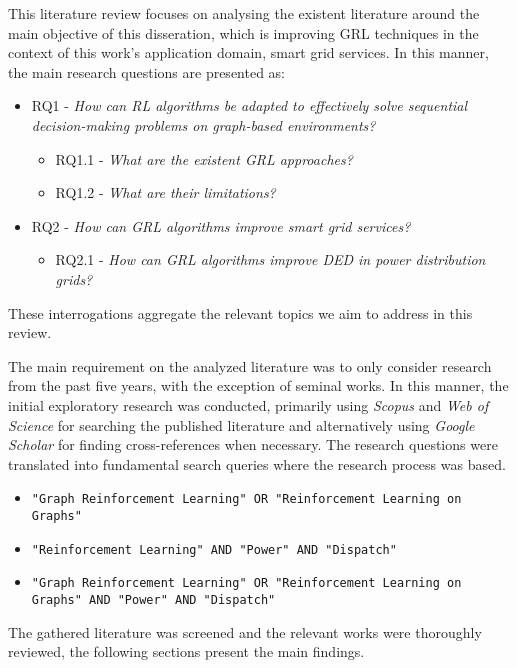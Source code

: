 This literature review focuses on analysing the existent literature around the main objective of this disseration, which is improving \ac{GRL} techniques in the context of this work's application domain, smart grid services. In this manner, the main research questions are presented as:

\begin{itemize}
	\item RQ1 - \textit{How can \ac{RL} algorithms be adapted to effectively solve sequential decision-making problems on graph-based environments?} 
	\begin{itemize}
		\item RQ1.1 - \textit{What are the existent \ac{GRL} approaches?}
		\item RQ1.2 - \textit{What are their limitations? }
	\end{itemize}
	\item RQ2 - \textit{How can \ac{GRL} algorithms improve smart grid services?}
	\begin{itemize}
		\item RQ2.1 - \textit{How can \ac{GRL} algorithms improve \acf{DED} in power distribution grids?}
	\end{itemize}
\end{itemize}

These interrogations aggregate the relevant topics we aim to address in this review. 

The main requirement on the analyzed literature was to only consider research from the past five years, with the exception of seminal works. In this manner, the initial exploratory research was conducted, primarily using \textit{Scopus} and \textit{Web of Science} for searching the published literature and alternatively using \textit{Google Scholar} for finding cross-references when necessary. 
The research questions were translated into fundamental search queries where the research process was based.


\begin{itemize}
	\item \texttt{"Graph Reinforcement Learning" OR "Reinforcement Learning on Graphs"}
	\item \texttt{"Reinforcement Learning" AND "Power" AND "Dispatch"}
	\item \texttt{"Graph Reinforcement Learning" OR "Reinforcement Learning on Graphs" AND "Power" AND "Dispatch"}
\end{itemize}

 The gathered literature was screened and the relevant works were thoroughly reviewed, the following sections present the main findings.






